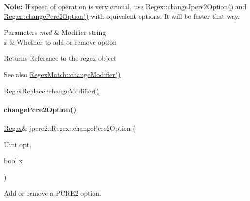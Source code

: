 {\bfseries Note\+:} If speed of operation is very crucial, use \hyperlink{classjpcre2_1_1Regex_ab8e0b1a49eeb1077ba54cf3b5292c95e_ab8e0b1a49eeb1077ba54cf3b5292c95e}{Regex\+::change\+Jpcre2\+Option()} and \hyperlink{classjpcre2_1_1Regex_ae5bde8008cc5a700163ca3162dbd5823_ae5bde8008cc5a700163ca3162dbd5823}{Regex\+::change\+Pcre2\+Option()} with equivalent options. It will be faster that way. 
\begin{DoxyParams}{Parameters}
{\em mod} & Modifier string \\
\hline
{\em x} & Whether to add or remove option \\
\hline
\end{DoxyParams}
\begin{DoxyReturn}{Returns}
Reference to the regex object 
\end{DoxyReturn}
\begin{DoxySeeAlso}{See also}
\hyperlink{classjpcre2_1_1RegexMatch_a877be3123d789020d259939bc79e8cfe_a877be3123d789020d259939bc79e8cfe}{Regex\+Match\+::change\+Modifier()} 

\hyperlink{classjpcre2_1_1RegexReplace_a0a2dc39fc28e6f7fe0a5d638f5891bdb_a0a2dc39fc28e6f7fe0a5d638f5891bdb}{Regex\+Replace\+::change\+Modifier()} 
\end{DoxySeeAlso}
\hypertarget{classjpcre2_1_1Regex_ae5bde8008cc5a700163ca3162dbd5823_ae5bde8008cc5a700163ca3162dbd5823}{}\label{classjpcre2_1_1Regex_ae5bde8008cc5a700163ca3162dbd5823_ae5bde8008cc5a700163ca3162dbd5823} 
\paragraph{\texorpdfstring{change\+Pcre2\+Option()}{changePcre2Option()}}
{\footnotesize\ttfamily \hyperlink{classjpcre2_1_1Regex}{Regex}\& jpcre2\+::\+Regex\+::change\+Pcre2\+Option (\begin{DoxyParamCaption}\item[{\hyperlink{namespacejpcre2_a078242d38221a13fb3543b9edd78c099}{Uint}}]{opt,  }\item[{bool}]{x }\end{DoxyParamCaption})\hspace{0.3cm}{\ttfamily [inline]}}



Add or remove a P\+C\+R\+E2 option. 



